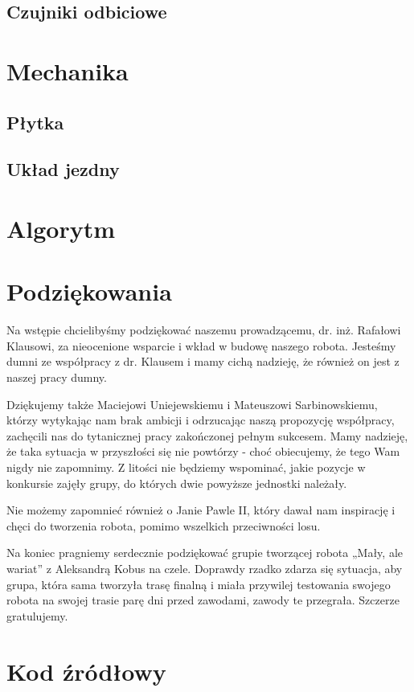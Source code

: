 \documentclass{article}
\begin{document}
\subsection{Czujniki odbiciowe}


\section{Mechanika}

\subsection{Płytka}


\subsection{Układ jezdny}


\section{Algorytm}


\section{Podziękowania}

Na wstępie chcielibyśmy podziękować naszemu prowadzącemu, dr. inż. Rafałowi Klausowi,  za nieocenione wsparcie i wkład w budowę naszego robota. Jesteśmy dumni ze współpracy z dr. Klausem i mamy cichą nadzieję, że również on jest z naszej pracy dumny.

Dziękujemy także Maciejowi Uniejewskiemu i Mateuszowi Sarbinowskiemu, którzy  wytykając nam brak ambicji i odrzucając naszą propozycję współpracy, zachęcili nas do tytanicznej pracy zakończonej pełnym sukcesem. Mamy nadzieję, że taka sytuacja w przyszłości się nie powtórzy - choć obiecujemy, że tego Wam nigdy nie zapomnimy. Z litości nie będziemy wspominać, jakie pozycje w konkursie zajęły grupy, do których dwie powyższe jednostki należały.

Nie możemy zapomnieć również o Janie Pawle II, który dawał nam inspirację i chęci do tworzenia robota, pomimo wszelkich przeciwności losu.

Na koniec pragniemy serdecznie podziękować grupie tworzącej robota „Mały, ale wariat” z Aleksandrą Kobus na czele. Doprawdy rzadko zdarza się sytuacja, aby grupa, która sama tworzyła trasę finalną i miała przywilej testowania swojego robota na swojej trasie parę dni przed zawodami, zawody te przegrała. Szczerze gratulujemy.

\newpage

\section{Kod źródłowy}


\newpage


\end{document}
